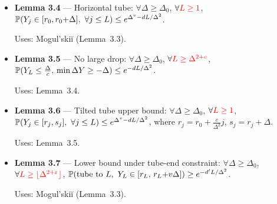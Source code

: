 \small
\begin{itemize}
    \item \textbf{Lemma 3.4} --- Horizontal tube: $\forall\Delta\ge\Delta_0$, $\forall {\color{red}L\ge1}$,
    $\P(Y_j\in[r_0,r_0{+}\Delta],\ \forall j\le L)\le e^{\Delta^v-dL/\Delta^2}$.
    \par\smallskip
    {\footnotesize\color{blue!60!black}Uses: Mogul'ski\u{i} (Lemma~3.3).}

    \item \textbf{Lemma 3.5} --- No large drop: $\forall\Delta\ge\Delta_0$, $\forall {\color{red}L\ge\Delta^{2+c}}$,
    $\P(Y_L\le\frac{\Delta}{c},\,\min\Delta Y\ge-\Delta)\le e^{-dL/\Delta^2}$.
    \par\smallskip
    {\footnotesize\color{blue!60!black}Uses: Lemma~3.4.}

    \item \textbf{Lemma 3.6} --- Tilted tube upper bound: $\forall\Delta\ge\Delta_0$, $\forall {\color{red}L\ge1}$,
    $\P(Y_j\in[r_j,s_j],\ \forall j\le L)\le e^{\Delta^v-dL/\Delta^2}$, where $r_j=r_0+\frac{c}{\Delta^2}j$, $s_j=r_j+\Delta$.
    \par\smallskip
    {\footnotesize\color{blue!60!black}Uses: Lemma~3.5.}

    \item \textbf{Lemma 3.7} --- Lower bound under tube-end constraint: $\forall\Delta\ge\Delta_0$, $\forall {\color{red}L\ge\lfloor\Delta^{2+\varepsilon}\rfloor}$,
    $\P(\text{tube to }L,\ Y_L\in[r_L,\,r_L{+}v\Delta])\ge e^{-d'L/\Delta^2}$.
    \par\smallskip
    {\footnotesize\color{blue!60!black}Uses: Mogul'ski\u{i} (Lemma~3.3).}
\end{itemize}
